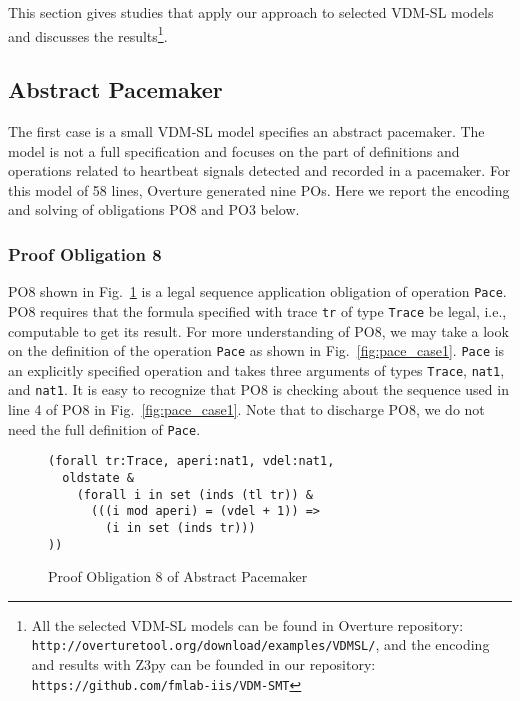 This section gives studies that apply our approach to selected VDM-SL models and discusses the results\footnote{All the selected VDM-SL models can be found in Overture repository: {\tt http://overturetool.org/download/examples/VDMSL/}, and the encoding and results with Z3py can be founded in our repository: {\tt https://github.com/fmlab-iis/VDM-SMT}}.

\subsection{Abstract Pacemaker}
\label{section:case1}

The first case is a small VDM-SL model specifies an abstract pacemaker. The model is not a full specification and focuses on the part of definitions and operations related to heartbeat signals detected and recorded in a pacemaker. For this model of 58 lines, Overture generated nine POs. Here we report the encoding and solving of obligations PO8 and PO3 below.

\subsubsection{Proof Obligation 8}

PO8 shown in Fig.~\ref{fig:po8_case1} is a legal sequence application obligation of operation {\tt Pace}.  PO8 requires that the formula specified with trace {\tt tr} of type {\tt Trace} be legal, i.e., computable to get its result. For more understanding of PO8, we may take a look on the definition of the operation {\tt Pace} as shown in Fig.~\ref{fig:pace_case1}. {\tt Pace} is an explicitly specified operation and takes three arguments of types {\tt Trace}, {\tt nat1}, and {\tt nat1}. It is easy to recognize that PO8 is checking about the sequence used in line 4 of PO8 in Fig.~\ref{fig:pace_case1}. Note that to discharge PO8, we do not need the full definition of {\tt Pace}.

\begin{figure}[t]
\begin{center}
\begin{mdframed}[roundcorner=5pt]
\begin{Verbatim}[fontsize=\small]
(forall tr:Trace, aperi:nat1, vdel:nat1,
  oldstate & 
    (forall i in set (inds (tl tr)) &
      (((i mod aperi) = (vdel + 1)) =>
        (i in set (inds tr)))
))
\end{Verbatim}
\end{mdframed}
\vspace{-10pt}
\caption{Proof Obligation 8 of Abstract Pacemaker}
\label{fig:po8_case1}
\end{center}
\end{figure}

